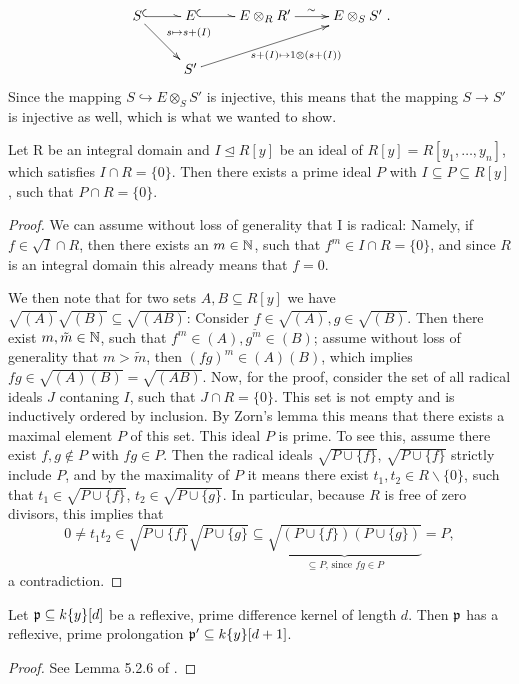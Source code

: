 \begin{prop}
\begin{bew}
\[\begin{xy}
 \xymatrix{
      S \ar@^{(->}[r] \ar[rd]^-{ s \mapsto s + (I)} &E \ar@^{(->}[r] & E \otimes_R R' \ar[r]^\sim & E \otimes_S S' \\ 
      & S' \ar[urr]_-{~~~~~ s + (I) \mapsto 1 \otimes (s + (I)) }}
\end{xy}.
\]
Since the mapping $S \hookrightarrow E \otimes_S S'$ is injective, this means that the mapping $S \rightarrow S'$ is injective as well, which is what we wanted to show.
\end{bew}
\end{prop}


\begin{lem}\label{primeoverp1}
Let R be an integral domain and $I \unlhd R[y]$ be an ideal of $R[y] = R[y_1,\ldots,y_n]$, which satisfies $I \cap R = \{ 0 \}$.
Then there exists a prime ideal $P$ with $I \subseteq P \subseteq R[y] $, such that $P \cap R = \{0\}$.
\begin{proof}
We can assume without loss of generality that I is radical:
Namely, if $f \in \sqrt{I} \cap R$, then there exists an $m \in \mathbb{N}$, such that $f^m \in I \cap R = \{0\}$, and since $R$ is an integral domain this already means that $f = 0$. 

We then note that for two sets $A,B \subseteq R[y]$ we have $\sqrt{(A)}\sqrt{(B)} \subseteq \sqrt{(AB)}$: Consider $f \in \sqrt{(A)}, g \in \sqrt{(B)}$. Then there exist $m, \tilde m \in \mathbb{N}$, such that $f^m \in (A), g^{\tilde m} \in (B)$;
 assume without loss of generality that $m > \tilde m$, then $(fg)^m \in (A)(B)$, which implies $fg \in \sqrt{(A)(B)} = \sqrt{(AB)}$.
Now, for the proof, consider the set of all radical ideals $J$ contaning $I$, such that $J \cap R = \{0\}$. This set is not empty and is inductively ordered by inclusion.
By Zorn's lemma this means that there exists a maximal element $P$ of this set. This ideal $P$ is prime. To see this, assume there exist $f,g \notin P$ with $fg \in P$. 
Then the radical ideals $\sqrt{P \cup \{f\}}$, $\sqrt{P \cup \{f\}}$ strictly include $P$, and by the maximality of $P$ it means there exist $t_1, t_2 \in R\backslash\{0\}$, such that
$t_1 \in \sqrt{P \cup \{f\}}$, $t_2 \in \sqrt{P \cup \{g\}}$. In particular, because $R$ is free of zero divisors, this implies that
 \[0 \neq t_1t_2 \in \sqrt{P \cup \{f\}}\sqrt{P \cup \{g\}} \subseteq  \underbrace{\sqrt{(P \cup \{f\})(P \cup \{g\})}}_{\subseteq P\text{, since }fg \in P} = P, \]
a contradiction.
\end{proof}
\end{lem}

\begin{prop}\label{reflexiveprol}
Let $\mathfrak{p} \subseteq k\{y\}[d]$ be a reflexive, prime difference kernel of length $d$. Then $\mathfrak{p}$ has a reflexive, prime prolongation $\mathfrak{p}' \subseteq k\{y\}[d+1]$.
\begin{proof}
See Lemma 5.2.6 of \cite{wibmer}.
\end{proof}
\end{prop}


